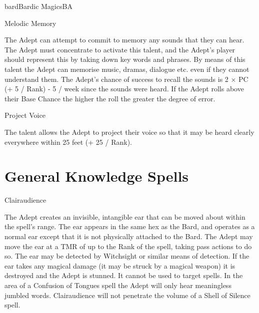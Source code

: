 \begin{College}[2.1]{bard}{Bardic Magics}{BA}
\begin{talent}[T-3]{Melodic Memory}

\begin{effects}
The Adept can attempt to commit to memory any sounds that they can
hear.  The Adept must concentrate to activate this talent, and the
Adept’s player should represent this by taking down key words and
phrases.  By means of this talent the Adept can memorise music,
dramas, dialogue etc.  even if they cannot understand them.  The
Adept’s chance of success to recall the sounds is 2 × PC (+ 5 / Rank)
- 5 / week since the sounds were heard. If the Adept rolls above their
Base Chance the higher the roll the greater the degree of error.
\end{effects}
\end{talent}

\begin{talent}[T-4]{Project Voice}

\begin{effects}
The talent allows the Adept to project their voice so that it may be
heard clearly everywhere within 25 feet (+ 25 / Rank).
\end{effects}
\end{talent}


\section{General Knowledge Spells}

\begin{spell}[G-1]{Clairaudience}

\begin{effects}
The Adept creates an invisible, intangible ear that can be moved about
within the spell’s range. The ear appears in the same hex as the Bard,
and operates as a normal ear except that it is not physically attached
to the Bard.  The Adept may move the ear at a TMR of up to the Rank of
the spell, taking pass actions to do so. The ear may be detected by
Witchsight or similar means of detection.  If the ear takes any
magical damage (it may be struck by a magical weapon) it is destroyed
and the Adept is stunned.  It cannot be used to target spells.  In the
area of a Confusion of Tongues spell the Adept will only hear
meaningless jumbled words.  Clairaudience will not penetrate the
volume of a Shell of Silence spell.
\end{effects}
\end{spell}


\end{College}
